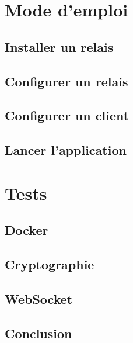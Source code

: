 \documentclass[a4paper,12pt]{report}
\begin{document}
\newpage	
\section{Mode d'emploi}
	\subsection{Installer un relais}
	
	\subsection{Configurer un relais}
	
	\subsection{Configurer un client}

	\subsection{Lancer l'application}
	
\newpage	
\section{Tests}
	\subsection{Docker}
	
	\subsection{Cryptographie}
	
	\subsection{WebSocket}

\newpage	
\begin{center}
\section*{Conclusion}
\end{center}
\end{document}
